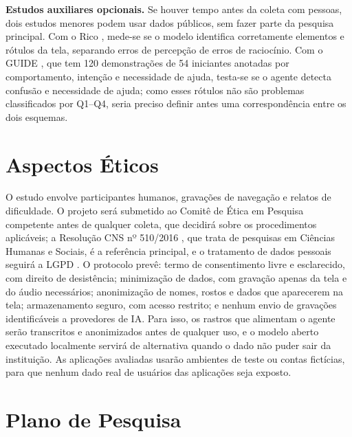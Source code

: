 \documentclass[12pt]{article}
\begin{document}
\textbf{Estudos auxiliares opcionais.} Se houver tempo antes da coleta com pessoas, dois estudos menores podem usar dados públicos, sem fazer parte da pesquisa principal. Com o Rico \cite{deka2017rico}, mede-se se o modelo identifica corretamente elementos e rótulos da tela, separando erros de percepção de erros de raciocínio. Com o GUIDE \cite{yang2026guide}, que tem 120 demonstrações de 54 iniciantes anotadas por comportamento, intenção e necessidade de ajuda, testa-se se o agente detecta confusão e necessidade de ajuda; como esses rótulos não são problemas classificados por Q1--Q4, seria preciso definir antes uma correspondência entre os dois esquemas.

\section{Aspectos Éticos}
\label{sec:etica}

O estudo envolve participantes humanos, gravações de navegação e relatos de dificuldade. O projeto será submetido ao Comitê de Ética em Pesquisa competente antes de qualquer coleta, que decidirá sobre os procedimentos aplicáveis; a Resolução CNS nº 510/2016 \cite{cns2016res510}, que trata de pesquisas em Ciências Humanas e Sociais, é a referência principal, e o tratamento de dados pessoais seguirá a LGPD \cite{brasil2018lgpd}. O protocolo prevê: termo de consentimento livre e esclarecido, com direito de desistência; minimização de dados, com gravação apenas da tela e do áudio necessários; anonimização de nomes, rostos e dados que aparecerem na tela; armazenamento seguro, com acesso restrito; e nenhum envio de gravações identificáveis a provedores de IA. Para isso, os rastros que alimentam o agente serão transcritos e anonimizados antes de qualquer uso, e o modelo aberto executado localmente servirá de alternativa quando o dado não puder sair da instituição. As aplicações avaliadas usarão ambientes de teste ou contas fictícias, para que nenhum dado real de usuários das aplicações seja exposto.

\section{Plano de Pesquisa}
\label{sec:plano}
\end{document}
